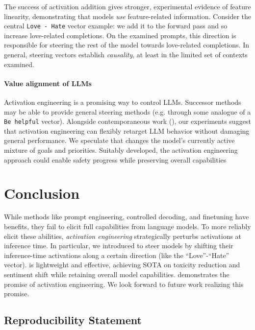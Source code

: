 \documentclass{article}
\newcommand{\method}{\text{Activation Addition}}
\newcommand{\shortmethod}{\text{ActAdd}}
\theoremstyle{plain}
\theoremstyle{definition}
\theoremstyle{remark}
\begin{document}
The success of activation addition gives stronger, experimental evidence of feature linearity, demonstrating that models \emph{use} feature-related information. Consider the central \texttt{Love - Hate} vector example: we add it to the forward pass and so increase love-related completions. On the examined prompts, this direction is responsible for steering the rest of the model towards love-related completions. In general, steering vectors establish \emph{causality}, at least in the limited set of contexts examined.

\vspace{-2mm}

\paragraph{Value alignment of LLMs}
Activation engineering is a promising way to control LLMs. Successor methods may be able to 
provide general steering methods (e.g. through some analogue of a \texttt{Be helpful} vector). Alongside contemporaneous work (\cite{li2023inferencetime,liu2023incontext}), our experiments suggest that activation engineering can flexibly retarget LLM behavior without damaging general performance. We speculate that {\shortmethod}  changes the model's currently active mixture of goals and priorities. Suitably developed, the activation engineering approach could enable safety progress while preserving overall capabilities

% 

\section{Conclusion}
While methods like prompt engineering, controlled decoding, and finetuning have benefits, they fail to elicit full capabilities from language models. To more reliably elicit these abilities, \emph{activation engineering} strategically perturbs activations at inference time. In particular, we introduced \emph{{\method}} to steer models by shifting their inference-time activations along a certain direction (like the ``Love''-``Hate'' vector). {\shortmethod} is lightweight and effective, achieving SOTA on toxicity reduction and sentiment shift while retaining overall model capabilities. {\shortmethod} demonstrates the promise of activation engineering. We look forward to future work realizing this promise.
% 
\newpage

\subsection*{Reproducibility Statement}
\end{document}
